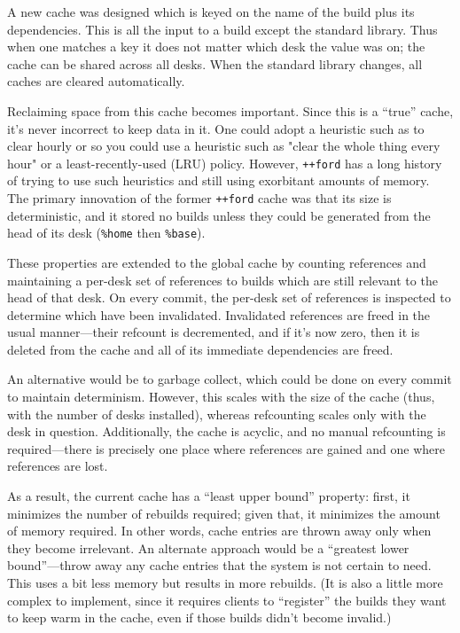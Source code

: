 \documentclass[twoside]{article}
\begin{document}
A new cache was designed which is keyed on the name of the build plus its dependencies. This is all the input to a build except the standard library.  Thus when one matches a key it does not matter which desk the value was on; the cache can be shared across all desks.  When the standard library changes, all caches are cleared automatically.

Reclaiming space from this cache becomes important.  Since this is a “true” cache, it's never incorrect to keep data in it.  One could adopt a heuristic such as to clear hourly or so you could use a heuristic such as "clear the whole thing every hour" or a least-recently-used (LRU) policy.  However, \texttt{++ford} has a long history of trying to use such heuristics and still using exorbitant amounts of memory.  The primary innovation of the former \texttt{++ford} cache was that its size is deterministic, and it stored no builds unless they could be generated from the head of its desk (\texttt{\%home} then \texttt{\%base}).

These properties are extended to the global cache by counting references and maintaining a per-desk set of references to builds which are still relevant to the head of that desk.  On every commit, the per-desk set of references is inspected to determine which have been invalidated.  Invalidated references are freed in the usual manner—their refcount is decremented, and if it's now zero, then it is deleted from the cache and all of its immediate dependencies are freed.

An alternative would be to garbage collect, which could be done on every commit to maintain determinism.  However, this scales with the size of the cache (thus, with the number of desks installed), whereas refcounting scales only with the desk in question.  Additionally, the cache is acyclic, and no manual refcounting is required—there is precisely one place where references are gained and one where references are lost.

As a result, the current cache has a “least upper bound” property:  first, it minimizes the number of rebuilds required; given that, it minimizes the amount of memory required.  In other words, cache entries are thrown away only when they become irrelevant.  An alternate approach would be a “greatest lower bound”—throw away any cache entries that the system is not certain to need.  This uses a bit less memory but results in more rebuilds.  (It is also a little more complex to implement, since it requires clients to “register” the builds they want to keep warm in the cache, even if those builds didn't become invalid.)
\end{document}
